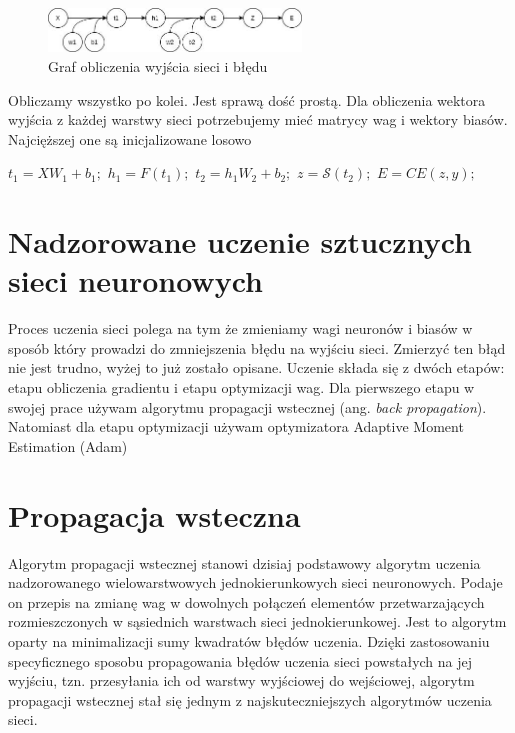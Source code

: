 \documentclass{article}
\begin{document}
\begin{figure}[H]
	\centering
	\includegraphics[width=0.6\textwidth,keepaspectratio=true]{feed_forward_graph}
	\caption{
		Graf obliczenia wyjścia sieci i błędu  
	}
	\label{feed_forward_graph}
\end{figure}

\begin{flushleft}
Obliczamy wszystko po kolei. Jest sprawą dość prostą. Dla obliczenia wektora wyjścia z każdej warstwy sieci potrzebujemy mieć matrycy wag i wektory biasów. Najcięższej one są inicjalizowane losowo

$t_1 = XW_1 + b_1;$\newline
$h_1 = F(t_1);$\newline
$t_2 = h_1W_2 + b_2;$\newline
$z = \mathcal{S}(t_2);$\newline
$E = CE(z,y);$

\end{flushleft}


\section{Nadzorowane uczenie sztucznych sieci neuronowych}
Proces uczenia sieci polega na tym że zmieniamy wagi neuronów i biasów w sposób który prowadzi do zmniejszenia błędu na wyjściu sieci. Zmierzyć ten błąd nie jest trudno, wyżej to już zostało opisane. Uczenie składa się z dwóch etapów: etapu obliczenia gradientu i etapu optymizacji wag. 
Dla pierwszego etapu w swojej prace używam algorytmu propagacji wstecznej (ang. \textit{back propagation}). Natomiast dla etapu optymizacji używam optymizatora Adaptive Moment Estimation (Adam)

\section{Propagacja wsteczna}
Algorytm propagacji wstecznej stanowi dzisiaj podstawowy algorytm uczenia nadzorowanego wielowarstwowych jednokierunkowych sieci neuronowych. Podaje on przepis na zmianę wag w dowolnych połączeń elementów przetwarzających rozmieszczonych w sąsiednich warstwach sieci jednokierunkowej. Jest to algorytm oparty na minimalizacji sumy kwadratów błędów uczenia. Dzięki zastosowaniu specyficznego sposobu propagowania błędów uczenia sieci powstałych na jej wyjściu, tzn. przesyłania ich od warstwy wyjściowej do wejściowej, algorytm propagacji wstecznej stał się jednym z najskuteczniejszych algorytmów uczenia sieci. \cite{nn_jozef}
\end{document}
